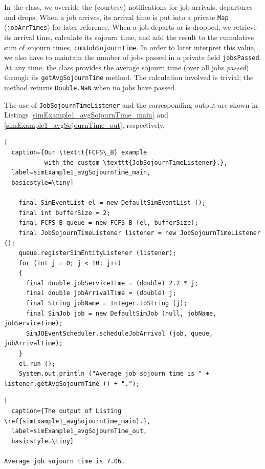 \documentclass[12pt]{book}
\begin{document}
In the class, we override the (courtesy) notifications for job arrivals,
  departures and drops.
When a job arrives, its arrival time is put into a private \lstinline|Map| (\lstinline|jobArrTimes|)
  for later reference.
When a job departs or is dropped,
  we retrieve its arrival time,
  calculate its sojourn time,
  and add the result to the cumulative sum
  of sojourn times, \lstinline|cumJobSojournTime|.
In order to later interpret this value,
  we also have to maintain the number of jobs passed
  in a private field \lstinline|jobsPassed|.
At any time,
  the class provides the average sojourn time (over all jobs {\em passed\/})
  through its \lstinline|getAvgSojournTime| method.
The calculation involved is trivial;
  the method returns \lstinline|Double.NaN| when
  no jobs have passed.

The use of \lstinline|JobSojournTimeListener| and the corresponding output
  are shown in Listings \ref{simExample1_avgSojournTime_main}
  and \ref{simExample1_avgSojournTime_out}, respectively.

\begin{lstfloat}
\begin{lstlisting}[
  caption={Our \texttt{FCFS\_B} example
           with the custom \texttt{JobSojournTimeListener}.},
  label=simExample1_avgSojournTime_main,
  basicstyle=\tiny]

    final SimEventList el = new DefaultSimEventList ();
    final int bufferSize = 2;
    final FCFS_B queue = new FCFS_B (el, bufferSize);
    final JobSojournTimeListener listener = new JobSojournTimeListener ();
    queue.registerSimEntityListener (listener);
    for (int j = 0; j < 10; j++)
    {
      final double jobServiceTime = (double) 2.2 * j;
      final double jobArrivalTime = (double) j;
      final String jobName = Integer.toString (j);
      final SimJob job = new DefaultSimJob (null, jobName, jobServiceTime);
      SimJQEventScheduler.scheduleJobArrival (job, queue, jobArrivalTime);
    }
    el.run ();
    System.out.println ("Average job sojourn time is " + listener.getAvgSojournTime () + ".");

\end{lstlisting}
\end{lstfloat}

\begin{lstfloat}
\begin{lstlisting}[
  caption={The output of Listing \ref{simExample1_avgSojournTime_main}.},
  label=simExample1_avgSojournTime_out,
  basicstyle=\tiny]

Average job sojourn time is 7.06.

\end{lstlisting}
\end{lstfloat}
\end{document}
